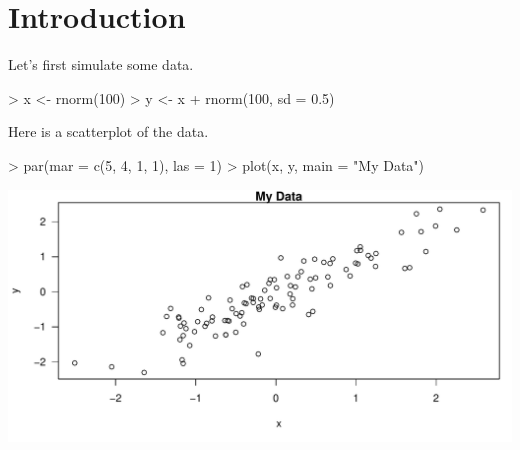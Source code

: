 \documentclass[11pt]{article}
\begin{document}
\section{Introduction}
Let's first simulate some data.
\begin{Schunk}
\begin{Sinput}
> x <- rnorm(100)
> y <- x + rnorm(100, sd = 0.5)
\end{Sinput}
\end{Schunk}
Here is a scatterplot of the data.
\begin{Schunk}
\begin{Sinput}
> par(mar = c(5, 4, 1, 1), las = 1)
> plot(x, y, main = "My Data")
\end{Sinput}
\end{Schunk}
\includegraphics{example5-scatterplot}
\end{document}
